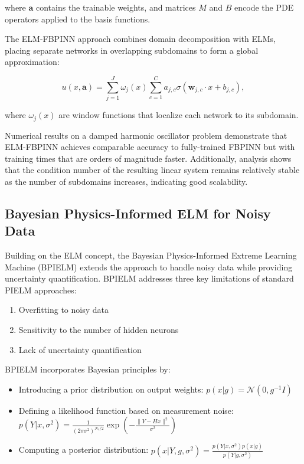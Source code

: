 \documentclass[11pt]{article}
\begin{document}
where $\mathbf{a}$ contains the trainable weights, and matrices $M$ and $B$ encode the PDE operators applied to the basis functions.

The ELM-FBPINN approach combines domain decomposition with ELMs, placing separate networks in overlapping subdomains to form a global approximation:

\begin{equation}
    u(x,\mathbf{a}) = \sum_{j=1}^{J} \omega_j(x) \sum_{c=1}^{C} a_{j,c} \sigma(\mathbf{w}_{j,c} \cdot x + b_{j,c}),
\end{equation}

where $\omega_j(x)$ are window functions that localize each network to its subdomain.

Numerical results on a damped harmonic oscillator problem demonstrate that ELM-FBPINN achieves comparable accuracy to fully-trained FBPINN but with training times that are orders of magnitude faster. Additionally, analysis shows that the condition number of the resulting linear system remains relatively stable as the number of subdomains increases, indicating good scalability.

\subsection{Bayesian Physics-Informed ELM for Noisy Data}

Building on the ELM concept, the Bayesian Physics-Informed Extreme Learning Machine (BPIELM) \citep{Liu2023} extends the approach to handle noisy data while providing uncertainty quantification. BPIELM addresses three key limitations of standard PIELM approaches:
\begin{enumerate}
    \item Overfitting to noisy data
    \item Sensitivity to the number of hidden neurons
    \item Lack of uncertainty quantification
\end{enumerate}

BPIELM incorporates Bayesian principles by:
\begin{itemize}
    \item Introducing a prior distribution on output weights: $p(x|g) = \mathcal{N}(0, g^{-1}I)$
    \item Defining a likelihood function based on measurement noise: $p(Y|x,\sigma^2) = \frac{1}{(2\pi\sigma^2)^{N_c/2}} \exp\left(-\frac{\|Y-Hx\|^2}{\sigma^2}\right)$
    \item Computing a posterior distribution: $p(x|Y,g,\sigma^2) = \frac{p(Y|x,\sigma^2)p(x|g)}{p(Y|g,\sigma^2)}$
\end{itemize}
\end{document}
